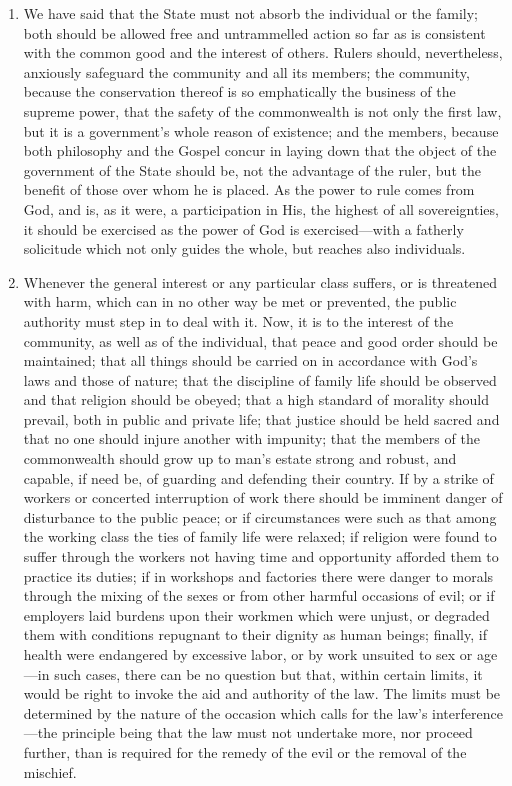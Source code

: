 \documentclass{book}
\begin{document}
\begin{enumerate}
	\item We have said that the State must not absorb the individual or the family; both should be allowed free and untrammelled action so far as is consistent with the common good and the interest of others. Rulers should, nevertheless, anxiously safeguard the community and all its members; the community, because the conservation thereof is so emphatically the business of the supreme power, that the safety of the commonwealth is not only the first law, but it is a government’s whole reason of existence; and the members, because both philosophy and the Gospel concur in laying down that the object of the government of the State should be, not the advantage of the ruler, but the benefit of those over whom he is placed. As the power to rule comes from God, and is, as it were, a participation in His, the highest of all sovereignties, it should be exercised as the power of God is exercised—with a fatherly solicitude which not only guides the whole, but reaches also individuals.


	\item Whenever the general interest or any particular class suffers, or is threatened with harm, which can in no other way be met or prevented, the public authority must step in to deal with it. Now, it is to the interest of the community, as well as of the individual, that peace and good order should be maintained; that all things should be carried on in accordance with God’s laws and those of nature; that the discipline of family life should be observed and that religion should be obeyed; that a high standard of morality should prevail, both in public and private life; that justice should be held sacred and that no one should injure another with impunity; that the members of the commonwealth should grow up to man’s estate strong and robust, and capable, if need be, of guarding and defending their country. If by a strike of workers or concerted interruption of work there should be imminent danger of disturbance to the public peace; or if circumstances were such as that among the working class the ties of family life were relaxed; if religion were found to suffer through the workers not having time and opportunity afforded them to practice its duties; if in workshops and factories there were danger to morals through the mixing of the sexes or from other harmful occasions of evil; or if employers laid burdens upon their workmen which were unjust, or degraded them with conditions repugnant to their dignity as human beings; finally, if health were endangered by excessive labor, or by work unsuited to sex or age—in such cases, there can be no question but that, within certain limits, it would be right to invoke the aid and authority of the law. The limits must be determined by the nature of the occasion which calls for the law’s interference—the principle being that the law must not undertake more, nor proceed further, than is required for the remedy of the evil or the removal of the mischief.



\end{enumerate}
\end{document}
